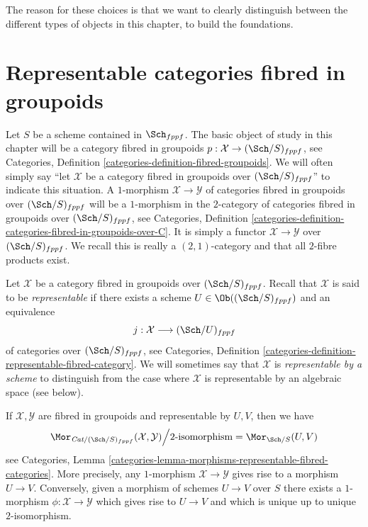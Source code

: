\medskip\noindent
The reason for these choices is that we want to clearly distinguish between
the different types of objects in this chapter, to build the foundations.

\section{Representable categories fibred in groupoids}
\label{algebraic-section-representable}
Let $S$ be a scheme contained in $\Sch_{fppf}$.
The basic object of study in this chapter will be a
category fibred in groupoids
$p : \mathcal{X} \to (\Sch/S)_{fppf}$, see
Categories, Definition \ref{categories-definition-fibred-groupoids}.
We will often simply say ``let $\mathcal{X}$ be a category fibred
in groupoids over $(\Sch/S)_{fppf}$'' to indicate
this situation. A $1$-morphism $\mathcal{X} \to \mathcal{Y}$ of categories
fibred in groupoids over $(\Sch/S)_{fppf}$ will be a $1$-morphism
in the $2$-category of categories fibred in groupoids over
$(\Sch/S)_{fppf}$, see
Categories,
Definition \ref{categories-definition-categories-fibred-in-groupoids-over-C}.
It is simply a functor $\mathcal{X} \to \mathcal{Y}$ over
$(\Sch/S)_{fppf}$.
We recall this is really a $(2, 1)$-category and that all $2$-fibre products
exist.

\medskip\noindent
Let $\mathcal{X}$ be a category fibred in groupoids over
$(\Sch/S)_{fppf}$. Recall that $\mathcal{X}$
is said to be {\it representable} if there exists a
scheme $U \in \Ob((\Sch/S)_{fppf})$ and an
equivalence
$$
j : \mathcal{X} \longrightarrow (\Sch/U)_{fppf}
$$
of categories over $(\Sch/S)_{fppf}$, see
Categories,
Definition \ref{categories-definition-representable-fibred-category}.
We will sometimes say that $\mathcal{X}$ is
{\it representable by a scheme} to distinguish from the case
where $\mathcal{X}$ is representable by an algebraic space (see
below).

\medskip\noindent
If $\mathcal{X}, \mathcal{Y}$ are fibred in groupoids and
representable by $U, V$, then we have
\begin{equation}
\label{equation-morphisms-schemes}
\Mor_{\textit{Cat}/(\Sch/S)_{fppf}}(\mathcal{X}, \mathcal{Y})
\Big/
2\text{-isomorphism}
=
\Mor_{\Sch/S}(U, V)
\end{equation}
see
Categories,
Lemma \ref{categories-lemma-morphisms-representable-fibred-categories}.
More precisely, any $1$-morphism $\mathcal{X} \to \mathcal{Y}$
gives rise to a morphism $U \to V$. Conversely, given a morphism
of schemes $U \to V$ over $S$ there exists a $1$-morphism
$\phi : \mathcal{X} \to \mathcal{Y}$ which gives rise to $U \to V$
and which is unique up to unique $2$-isomorphism.

